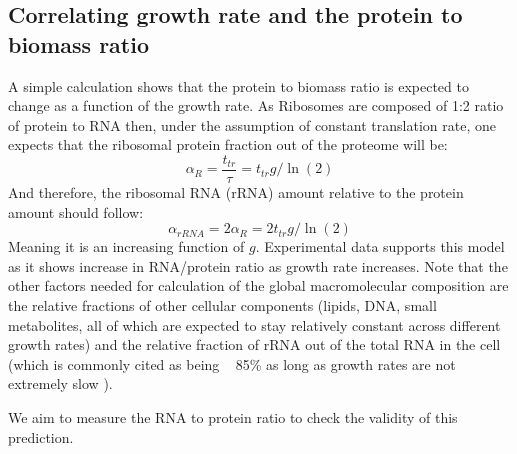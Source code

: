 \documentclass{report}
\begin{document}
\subsection{Correlating growth rate and the protein to biomass ratio}
A simple calculation shows that the protein to biomass ratio is expected to change as a function of the growth rate.
As Ribosomes are composed of 1:2 ratio of protein to RNA then, under the assumption of constant translation rate, one expects that the ribosomal protein fraction out of the proteome will be:
\[\alpha_R=\frac{t_{tr}}{\tau}=t_{tr}g/\ln(2)\]
And therefore, the ribosomal RNA (rRNA) amount relative to the protein amount should follow:
\[\alpha_{rRNA}=2\alpha_R=2t_{tr}g/\ln(2)\]
Meaning it is an increasing function of $g$.
Experimental data supports this model as it shows increase in RNA/protein ratio as growth rate increases.
Note that the other factors needed for calculation of the global macromolecular composition are the relative fractions of other cellular components (lipids, DNA, small metabolites, all of which are expected to stay relatively constant across different growth rates) and the relative fraction of rRNA out of the total RNA in the cell (which is commonly cited as being ~ 85\% as long as growth rates are not extremely slow \cite{Bremer1987,goldberger1979biological}).

We aim to measure the RNA to protein ratio to check the validity of this prediction.


\end{document}
